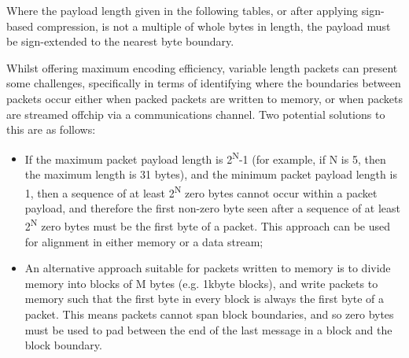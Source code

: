 Where the payload length given in the following tables, or after applying sign-based compression, is not a 
multiple of whole bytes in length, the payload must be sign-extended to the nearest byte boundary.

Whilst offering maximum encoding efficiency, variable length packets can present some challenges,
specifically in terms of identifying where the boundaries between packets occur either when packed
packets are written to memory, or when packets are streamed offchip via a communications channel.  Two 
potential solutions to this are as follows:

\begin{itemize}
  \item If the maximum packet payload length is 2\textsuperscript{N}-1 (for example, if N is 5, then the maximum length is
    31 bytes), and the minimum packet payload length is 1, then a sequence of at least 2\textsuperscript{N} zero 
    bytes cannot occur within a packet payload, and therefore the first non-zero byte seen after a sequence of 
    at least 2\textsuperscript{N} zero bytes must be the first byte of a packet.  This approach can be used for
    alignment in either memory or a data stream;
  \item An alternative approach suitable for packets written to memory is to divide memory into blocks of M bytes
    (e.g. 1kbyte blocks), and write packets to memory such that the first byte in every block is always the first
    byte of a packet.  This means packets cannot span block boundaries, and so zero bytes must be used to pad between 
    the end of the last message in a block and the block boundary.
\end{itemize}

